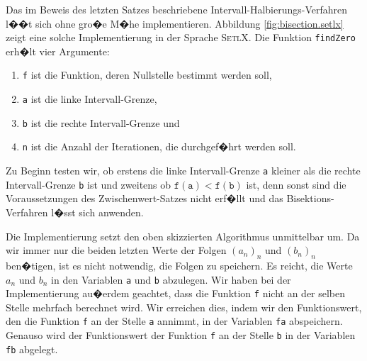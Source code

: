 \noindent
Das im Beweis des letzten Satzes beschriebene Intervall-Halbierungs-Verfahren l��t sich
ohne gro�e M�he  implementieren.  Abbildung \ref{fig:bisection.setlx}
zeigt eine solche Implementierung in der Sprache \textsc{SetlX}.  Die Funktion \texttt{findZero}
erh�lt vier Argumente:
\begin{enumerate}
\item \texttt{f} ist die Funktion, deren Nullstelle bestimmt werden soll,
\item \texttt{a} ist die linke Intervall-Grenze, 
\item \texttt{b} ist die rechte Intervall-Grenze und
\item \texttt{n} ist die Anzahl der Iterationen, die durchgef�hrt werden soll.
\end{enumerate}
Zu Beginn testen wir, ob erstens die linke Intervall-Grenze \texttt{a} kleiner als die rechte
Intervall-Grenze \texttt{b} ist und zweitens ob $\mathtt{f(a)} < \mathtt{f(b)}$ ist, denn sonst sind
die Voraussetzungen des Zwischenwert-Satzes nicht erf�llt und das Bisektions-Verfahren l�sst sich anwenden.

Die Implementierung setzt den oben skizzierten Algorithmus unmittelbar um.  Da wir immer nur die
beiden letzten Werte der Folgen $(a_n)_n$ und $(b_n)_n$ ben�tigen, ist es nicht notwendig, die
Folgen zu speichern.  Es reicht, die Werte $a_n$ und $b_n$ in den Variablen \texttt{a} und
\texttt{b} abzulegen.  Wir haben bei der Implementierung au�erdem geachtet, dass die Funktion
\texttt{f} nicht an der selben Stelle mehrfach berechnet wird.  Wir erreichen dies, indem wir den Funktionswert,
den die Funktion \texttt{f} an der Stelle \texttt{a} annimmt, in der Variablen \texttt{fa}
abspeichern.  Genauso wird der Funktionswert der Funktion \texttt{f} an der Stelle \texttt{b}
in der Variablen \texttt{fb} abgelegt.

